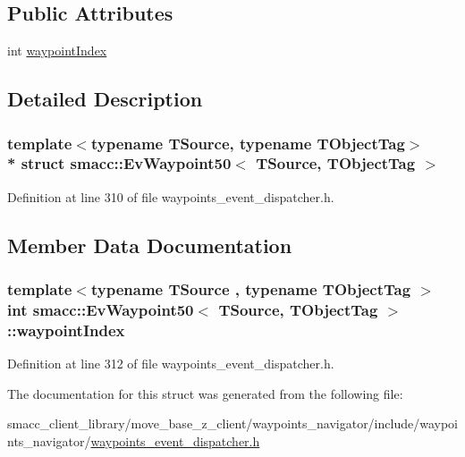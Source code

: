 \subsection*{Public Attributes}
\begin{DoxyCompactItemize}
\item 
int \hyperlink{structsmacc_1_1EvWaypoint50_a4a072e890be54f01f07f275e3711ba3d}{waypoint\+Index}
\end{DoxyCompactItemize}


\subsection{Detailed Description}
\subsubsection*{template$<$typename T\+Source, typename T\+Object\+Tag$>$\\*
struct smacc\+::\+Ev\+Waypoint50$<$ T\+Source, T\+Object\+Tag $>$}



Definition at line 310 of file waypoints\+\_\+event\+\_\+dispatcher.\+h.



\subsection{Member Data Documentation}
\subsubsection[{\texorpdfstring{waypoint\+Index}{waypointIndex}}]{\setlength{\rightskip}{0pt plus 5cm}template$<$typename T\+Source , typename T\+Object\+Tag $>$ int {\bf smacc\+::\+Ev\+Waypoint50}$<$ T\+Source, T\+Object\+Tag $>$\+::waypoint\+Index}\hypertarget{structsmacc_1_1EvWaypoint50_a4a072e890be54f01f07f275e3711ba3d}{}\label{structsmacc_1_1EvWaypoint50_a4a072e890be54f01f07f275e3711ba3d}


Definition at line 312 of file waypoints\+\_\+event\+\_\+dispatcher.\+h.



The documentation for this struct was generated from the following file\+:\begin{DoxyCompactItemize}
\item 
smacc\+\_\+client\+\_\+library/move\+\_\+base\+\_\+z\+\_\+client/waypoints\+\_\+navigator/include/waypoints\+\_\+navigator/\hyperlink{waypoints__event__dispatcher_8h}{waypoints\+\_\+event\+\_\+dispatcher.\+h}\end{DoxyCompactItemize}
